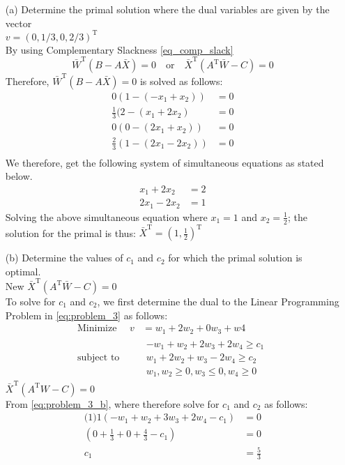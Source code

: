\documentclass[12pt,a4paper]{article}
\begin{document}
\begin{enumerate}
	\item[(a)] Determine the primal solution where the dual variables are given by the vector\\
		$v = (0, 1/3, 0, 2/3)^\text{T}$\\
		By using Complementary Slackness \eqref{eq_comp_slack}
		\begin{equation}
			\bar{W}^\text{T}(B - A\bar{X}) = 0 \quad  \text{or} \quad  \bar{X}^\text{T}(A^\text{T}\bar{W} - C) = 0
			\label{eq_comp_slack}
		\end{equation}
		Therefore, $\bar{W}^\text{T}(B - A\bar{X}) = 0 $ is solved as follows:
		\begin{align*}
				0(1 - (-x_1 + x_2)) &= 0\\
				\frac{1}{3} (2  - (x_1 + 2x_2) &= 0\\
				0(0 - (2x_1 + x_2)) &= 0\\
				\frac{2}{3} (1 - (2x_1 - 2x_2)) &= 0\\
		\end{align*}
		We therefore,  get the following system of simultaneous equations as stated below.
		\begin{align*}
				x_1 + 2x_2  &= 2 \\
				 2x_1 - 2x_2 &= 1
				 \label{eq:pset_3_sim}
		\end{align*}
		Solving the above simultaneous equation where $x_1 = 1$ and $x_2 = \frac{1}{2}$; the solution for the primal is thus:
			$\bar{X}^\text{T} = (1,\frac{1}{2})^\text{T}$
	\item[(b)] Determine the values of $c_1$ and $c_2$ for which the primal solution is optimal.\\
		New $ \bar{X}^\text{T}(A^\text{T}\bar{W} - C) = 0$\\
		To solve for $c_1$ and $c_2$, we first determine the dual to the Linear Programming Problem in \eqref{eq:problem_3} as follows:
\begin{equation}
    \begin{aligned}
    \text{Minimize }  \quad  v &=  w_1 + 2w_2 + 0w_3 + w4 \\
    \text{subject to }\quad &
        \begin{array}{c}
        	   -w_1 + w_2 + 2w_3 + 2w_4 \geq c_1 \\
        	   w_1 + 2w_2 + w_3 - 2w_4 \geq c_2 \\
        	   w_1,w_2 \geq 0, w_3 \leq 0, w_4 \geq 0
        \end{array}
    \end{aligned}
    \label{eq:problem_3_b}
\end{equation}
$\bar{X}^\text{T}(A^\text{T}W - C) = 0 $\\
From \eqref{eq:problem_3_b}, where therefore solve for $c_1$ and $c_2$ as follows:
\begin{align*}
		\text{(1)} 1(-w_1 + w_2 + 3w_3 + 2w_4 - c_1) &=0\\
		(0 + \frac{1}{3} + 0 + \frac{4}{3}  - c_1) &= 0\\
		c_1 &= \frac{5}{3}
\end{align*}


\end{enumerate}
\end{document}
